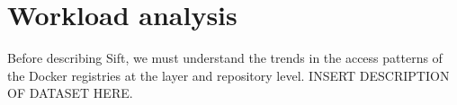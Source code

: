 \section{Workload analysis}
\label{sec:dataset-analysis}

%
%

%
Before describing Sift, we must understand the trends in the access patterns of the Docker registries at the layer and repository level. INSERT DESCRIPTION OF DATASET HERE.
%
%

